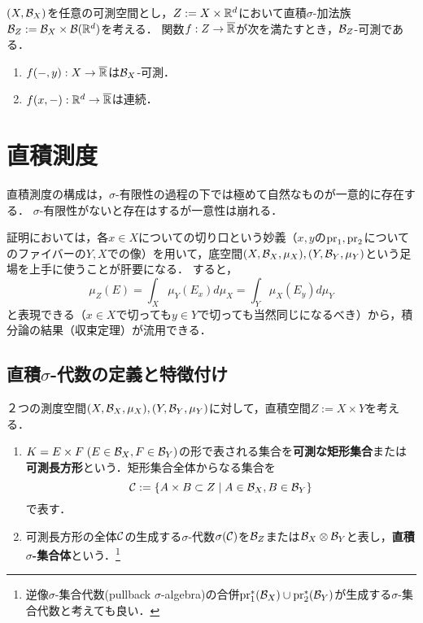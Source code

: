 \documentclass[uplatex, dvipdfmx]{jsreport}
\begin{document}
\begin{theorem}[直積の普遍性の破れ]
    $(X,\mathcal{B}_X)$を任意の可測空間とし，$Z:=X\times\mathbb{R}^d$において直積$\sigma$-加法族$\mathcal{B}_Z:=\mathcal{B}_X\times\mathcal{B}(\mathbb{R}^d)$を考える．
    関数$f:Z\to\overline{\mathbb{R}}$が次を満たすとき，$\mathcal{B}_Z$-可測である．
    \begin{enumerate}
        \item $f(-,y):X\to\overline{\mathbb{R}}$は$\mathcal{B}_X$-可測．
        \item $f(x,-):\mathbb{R}^d\to\overline{\mathbb{R}}$は連続．
    \end{enumerate}
\end{theorem}

\section{直積測度}

\begin{tcolorbox}[colframe=ForestGreen, colback=ForestGreen!10!white,breakable,colbacktitle=ForestGreen!40!white,coltitle=black,fonttitle=\bfseries\sffamily,
title=直積測度を積分形で捉える]
    直積測度の構成は，$\sigma$-有限性の過程の下では極めて自然なものが一意的に存在する．
    $\sigma$-有限性がないと存在はするが一意性は崩れる．

    証明においては，各$x\in X$についての切り口という妙義（$x,y$の$\mathrm{pr}_1,\mathrm{pr}_2$についてのファイバーの$Y,X$での像）を用いて，底空間$(X,\mathcal{B}_X,\mu_X),(Y,\mathcal{B}_Y,\mu_Y)$という足場を上手に使うことが肝要になる．
    すると，
    \[\mu_Z(E)=\int_X\mu_Y(E_x)d\mu_X=\int_Y\mu_X(E_y)d\mu_Y\]
    と表現できる（$x\in X$で切っても$y\in Y$で切っても当然同じになるべき）から，積分論の結果（収束定理）が流用できる．
\end{tcolorbox}

\subsection{直積$\sigma$-代数の定義と特徴付け}

\begin{definition}
    ２つの測度空間$(X,\mathcal{B}_X,\mu_X),(Y,\mathcal{B}_Y,\mu_Y)$に対して，直積空間$Z:=X\times Y$を考える．
    \begin{enumerate}
        \item $K=E\times F\;(E\in\mathcal{B}_X,F\in\mathcal{B}_Y)$の形で表される集合を\textbf{可測な矩形集合}または\textbf{可測長方形}という．矩形集合全体からなる集合を\[\mathcal{C}:=\left\{A\times B\subset Z\mid A\in\mathcal{B}_X,B\in\mathcal{B}_Y\right\}\]で表す．
        \item 可測長方形の全体$\mathcal{C}$の生成する$\sigma$-代数$\sigma(\mathcal{C})$を$\mathcal{B}_Z$または$\mathcal{B}_X\otimes\mathcal{B}_Y$と表し，\textbf{直積$\sigma$-集合体}という．\footnote{逆像$\sigma$-集合代数(pullback $\sigma$-algebra)の合併$\mathrm{pr}_1^*(\mathcal{B}_X)\cup\mathrm{pr}_2^*(\mathcal{B}_Y)$が生成する$\sigma$-集合代数と考えても良い．}
    \end{enumerate}
\end{definition}
\end{document}
